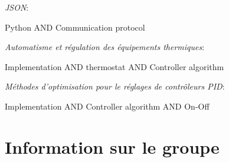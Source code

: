 \documentclass[12pt]{report}
\begin{document}
\textit{JSON}:

Python AND Communication protocol

\vspace*{0.3cm}

\textit{Automatisme et r\'{e}gulation des \'{e}quipements thermiques}:

Implementation AND thermostat AND Controller algorithm

\vspace*{0.3cm}

\textit{M\'{e}thodes d'optimisation pour le r\'{e}glages de contr\^{o}leurs PID}:

Implementation AND Controller algorithm AND On-Off

\chapter{Information sur le groupe}
\end{document}
